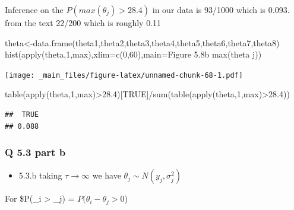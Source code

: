 \documentclass[
]{book}
\newenvironment{Shaded}{\begin{snugshade}}{\end{snugshade}}
\newcommand{\AttributeTok}[1]{\textcolor[rgb]{0.77,0.63,0.00}{#1}}
\newcommand{\DecValTok}[1]{\textcolor[rgb]{0.00,0.00,0.81}{#1}}
\newcommand{\FloatTok}[1]{\textcolor[rgb]{0.00,0.00,0.81}{#1}}
\newcommand{\FunctionTok}[1]{\textcolor[rgb]{0.00,0.00,0.00}{#1}}
\newcommand{\NormalTok}[1]{#1}
\newcommand{\OtherTok}[1]{\textcolor[rgb]{0.56,0.35,0.01}{#1}}
\newcommand{\SpecialCharTok}[1]{\textcolor[rgb]{0.00,0.00,0.00}{#1}}
\newcommand{\StringTok}[1]{\textcolor[rgb]{0.31,0.60,0.02}{#1}}
\providecommand{\tightlist}{%
  \setlength{\itemsep}{0pt}\setlength{\parskip}{0pt}}
\theoremstyle{definition}
\theoremstyle{definition}
\theoremstyle{definition}
\theoremstyle{definition}
\theoremstyle{remark}
\begin{document}
Inference on the \(P(max(\theta_j)>28.4)\) in our data is 93/1000 which is 0.093. from the text 22/200 which is roughly 0.11

\begin{Shaded}
\begin{Highlighting}[]
\NormalTok{theta}\OtherTok{\textless{}{-}}\FunctionTok{data.frame}\NormalTok{(theta1,theta2,theta3,theta4,theta5,theta6,theta7,theta8)}
 \FunctionTok{hist}\NormalTok{(}\FunctionTok{apply}\NormalTok{(theta,}\DecValTok{1}\NormalTok{,max),}\AttributeTok{xlim=}\FunctionTok{c}\NormalTok{(}\DecValTok{0}\NormalTok{,}\DecValTok{60}\NormalTok{),}\AttributeTok{main=}\StringTok{\textquotesingle{}Figure 5.8b max(theta j)\textquotesingle{}}\NormalTok{)}
\end{Highlighting}
\end{Shaded}

\texttt{[image: \_main\_files/figure-latex/unnamed-chunk-68-1.pdf]}

\begin{Shaded}
\begin{Highlighting}[]
 \FunctionTok{table}\NormalTok{(}\FunctionTok{apply}\NormalTok{(theta,}\DecValTok{1}\NormalTok{,max)}\SpecialCharTok{\textgreater{}}\FloatTok{28.4}\NormalTok{)[}\StringTok{\textquotesingle{}TRUE\textquotesingle{}}\NormalTok{]}\SpecialCharTok{/}\FunctionTok{sum}\NormalTok{(}\FunctionTok{table}\NormalTok{(}\FunctionTok{apply}\NormalTok{(theta,}\DecValTok{1}\NormalTok{,max)}\SpecialCharTok{\textgreater{}}\FloatTok{28.4}\NormalTok{))}
\end{Highlighting}
\end{Shaded}

\begin{verbatim}
##  TRUE 
## 0.088
\end{verbatim}

\hypertarget{q-5.3-part-b}{%
\subsubsection{Q 5.3 part b}\label{q-5.3-part-b}}

\begin{itemize}
\tightlist
\item
  5.3.b
  taking \(\tau \to \infty\) we have \(\theta_j \sim N(y_j, \sigma^2_j)\)
\end{itemize}

For \$P(\theta\_i \textgreater{} \theta\_j) = \(P(\theta_i - \theta_j>0\))
\end{document}
